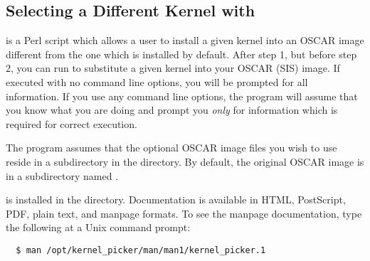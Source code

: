% 
% 
% 
% 

\subsection{Selecting a Different Kernel with }
\label{app:kernel-picker-overview}

 is a Perl script which allows a user to install a
given kernel into an OSCAR image different from the one which is
installed by default.  After step 1, but before step 2, you can run
 to substitute a given kernel into your OSCAR
(SIS) image.  If executed with no command line options, you will be
prompted for all information.  If you use any command line options,
the program will assume that you know what you are doing and prompt
you {\em only} for information which is required for correct
execution.

The  program assumes that the optional OSCAR image
files you wish to use reside in a subdirectory in the
 directory.  By default, the
original OSCAR image is in a subdirectory named .

 is installed in the
 directory.  Documentation is available
in HTML, PostScript, PDF, plain text, and manpage formats.  To see the
manpage documentation, type the following at a Unix command prompt:

\begin{verbatim}
  $ man /opt/kernel_picker/man/man1/kernel_picker.1
\end{verbatim}
